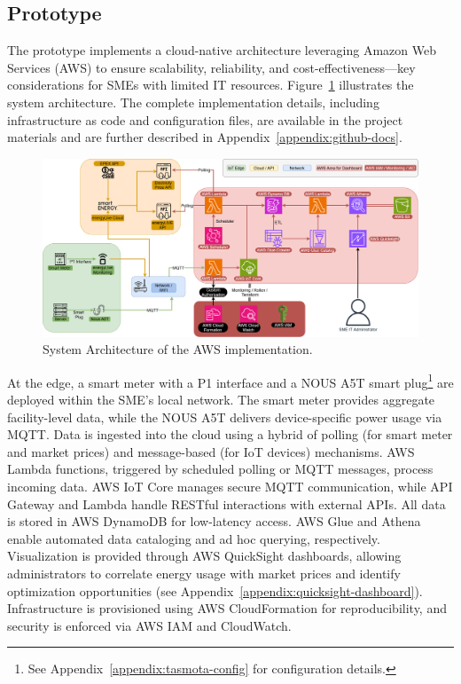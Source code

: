 \subsection{Prototype}
\label{methodology:prototype}
The prototype implements a cloud-native architecture leveraging Amazon Web Services (AWS) to ensure scalability, reliability, and cost-effectiveness—key considerations for SMEs with limited IT resources. Figure~\ref{fig:architecture} illustrates the system architecture. The complete implementation details, including infrastructure as code and configuration files, are available in the project materials and are further described in Appendix~\ref{appendix:github-docs}.
\begin{figure}[htbp]
\centering
\includegraphics[width=1.1\textwidth]{fig/architektur_new_2.png}
\caption{System Architecture of the AWS implementation.}
\label{fig:architecture}
\end{figure}
At the edge, a smart meter with a P1 interface and a NOUS A5T smart plug\footnote{See Appendix~\ref{appendix:tasmota-config} for configuration details.} are deployed within the SME's local network. The smart meter provides aggregate facility-level data, while the NOUS A5T delivers device-specific power usage via MQTT. Data is ingested into the cloud using a hybrid of polling (for smart meter and market prices) and message-based (for IoT devices) mechanisms.
AWS Lambda functions, triggered by scheduled polling or MQTT messages, process incoming data. AWS IoT Core manages secure MQTT communication, while API Gateway and Lambda handle RESTful interactions with external APIs. All data is stored in AWS DynamoDB for low-latency access. AWS Glue and Athena enable automated data cataloging and ad hoc querying, respectively.
Visualization is provided through AWS QuickSight dashboards, allowing administrators to correlate energy usage with market prices and identify optimization opportunities (see Appendix~\ref{appendix:quicksight-dashboard}).
Infrastructure is provisioned using AWS CloudFormation for reproducibility, and security is enforced via AWS IAM and CloudWatch.
